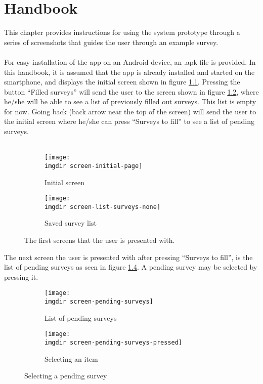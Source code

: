 \chapter{Handbook}
\label{chap:handbook}
This chapter provides instructions for using the system prototype through a series of screenshots that guides the user through an example survey.\\\\
For easy installation of the app on an Android device, an .apk file is provided. In this handbook, it is assumed that the app is already installed and started on the smartphone, and displays the initial screen shown in figure \ref{fig:screen-initial-page}. Pressing the button ``Filled surveys'' will send the user to the screen shown in figure \ref{fig:screen-list-surveys-none}, where he/she will be able to see a list of previously filled out surveys. This list is empty for now. Going back (back arrow near the top of the screen) will send the user to the initial screen where he/she can press ``Surveys to fill'' to see a list of pending surveys.\\\\
\begin{figure}[!htbp]
 \centering

 \begin{subfigure}{.3\textwidth}
    \centering
    \texttt{[image: \\imgdir screen-initial-page]}
    \caption{Initial screen}
    \label{fig:screen-initial-page}
  \end{subfigure}
  \begin{subfigure}{.3\textwidth}
    \centering
    \texttt{[image: \\imgdir screen-list-surveys-none]}
    \caption{Saved survey list}
    \label{fig:screen-list-surveys-none}
  \end{subfigure}

  \caption{The first screens that the user is presented with.}
  \label{fig:screen-initial-pages}
\end{figure}

The next screen the user is presented with after pressing ``Surveys to fill'', is the list of pending surveys as seen in figure \ref{fig:screen-pending-surveys}. A pending survey may be selected by pressing it.
\newpage

\begin{figure}[!htbp]
 \centering
 \begin{subfigure}{.3\textwidth}
    \centering
    \texttt{[image: \\imgdir screen-pending-surveys]}
    \caption{List of pending surveys}
    \label{fig:screen-pending-surveys}
  \end{subfigure}
  \begin{subfigure}{.3\textwidth}
    \centering
    \texttt{[image: \\imgdir screen-pending-surveys-pressed]}
    \caption{Selecting an item}
    \label{fig:screen-pending-surveys-pressed}
  \end{subfigure}
  \caption{Selecting a pending survey}
   \label{fig:screens-selecting-pending-survey}
\end{figure}

